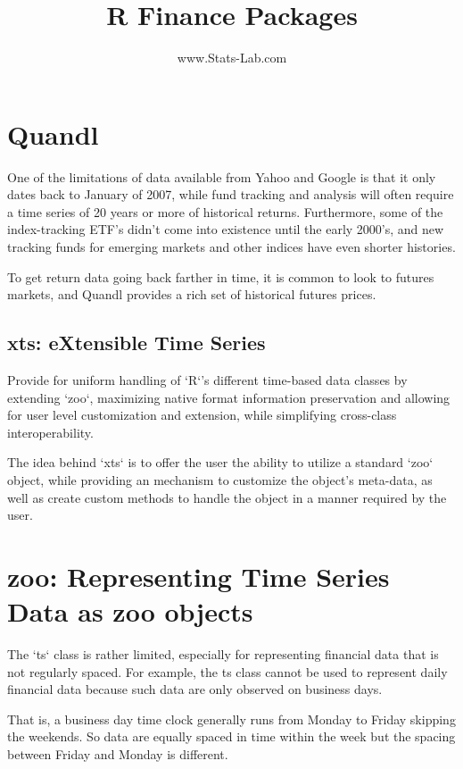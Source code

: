 \documentclass[]{article}
\title{R Finance Packages}
\author{www.Stats-Lab.com}
\begin{document}
\maketitle

\section{Quandl}

One of the limitations of data available from Yahoo and Google is that it only dates back to January of 2007, while fund tracking and analysis will often require a time series of 20 years or more of historical returns.  Furthermore, some of the index-tracking ETF's didn't come into existence until the early 2000's, and new tracking funds for emerging markets and other indices have even shorter histories.  

To get return data going back farther in time, it is common to look to futures markets, and Quandl provides a rich set of historical futures prices.

\subsection{xts: eXtensible Time Series}

Provide for uniform handling of `R`'s different time-based data classes by extending `zoo`, maximizing native format information preservation and allowing for user level customization and extension, while simplifying cross-class interoperability.

The idea behind `xts` is to offer the user the ability to utilize a standard `zoo` object, while providing an mechanism to customize the object's meta-data, as well as create custom methods to handle the object in a manner required by the user.

\section{zoo: Representing Time Series Data as zoo objects}
The `ts` class is rather limited, especially for representing financial data that is not regularly spaced. For
example, the ts class cannot be used to represent daily financial data because such data are only
observed on business days. 

That is, a business day time clock generally runs from Monday to Friday skipping the weekends. So data are equally spaced in time within the week but the spacing between
Friday and Monday is different. 
\end{document}
